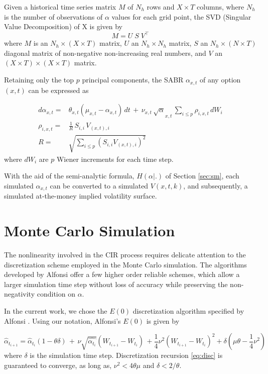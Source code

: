 \documentclass[12pt,oneside]{article}
\newcommand{\beqn}{\begin{equation}}
\newcommand{\eeqn}{\end{equation}}
\numberwithin{equation}{section}
\begin{document}
Given a historical time series matrix $M$ of $N_h$ rows and
$X\times T$ columns, where $N_h$ is the number of observations of $\alpha$ values for each grid point,
the SVD (Singular Value Decomposition) of X is given by
\beqn
M = U\;S\;V^\top
\eeqn
where $M$ is an $N_h\times(X\times T)$ matrix, $U$ an $N_h\times N_h$ matrix,
$S$ an $N_h\times(N\times T)$ diagonal matrix of non-negative non-increasing real numbers,
and $V$ an $(X\times T)\times(X\times T)$ matrix.

Retaining only the top $p$ principal components, the SABR $\alpha_{x,t}$ of any option $(x,t)$ can be expressed
as

\beqn
\begin{aligned}
d\alpha_{x,t}=&\theta_{x,t}(\mu_{x,t} - \alpha_{x,t})\,dt\,+\, \nu_{x,t}\,\sqrt\alpha_{x,t}\,
\sum_{i\le p}\rho_{i,x,t}\, dW_i\\
\rho_{i,x,t}=&\frac{1}{R}\,S_{i,i}\,V_{(x,t),i}\\[10pt]
R=&\sqrt{\sum_{i\le p}(S_{i,i}V_{(x,t),i})^2}
\end{aligned}
\eeqn
where $dW_i$ are $p$ Wiener increments for each time step.

With the aid of the semi-analytic formula, $H(\alpha|.)$ of Section \ref{sec:sm},
each simulated $\alpha_{x,t}$ can be converted to a simulated $V(x,t,k)$,
and subsequently, a simulated at-the-money implied volatility surface.

\section{Monte Carlo Simulation}
The nonlinearity involved in the CIR process requires delicate attention to the discretization
scheme employed in the Monte Carlo simulation.
The algorithms developed by Alfonsi \cite{A} offer a few higher order reliable schemes,
which allow a larger simulation time step without loss of accuracy while preserving the
non-negativity condition on $\alpha$.

In the current work, we chose the $E(0)$ discretization algorithm specified by Alfonsi \cite{A}.
Using our notation, Alfonsi's $E(0)$ is given by

\beqn\label{eq:disc}
\hat{\alpha}_{t_{i+1}}=\hat{\alpha}_{t_i}(1-\theta \delta)\,+\,\nu\sqrt{\hat{\alpha_{t_i}}}(W_{t_{i+1}}-W_{t_i})\,+
\frac{1}{4}\nu^2(W_{t_{i+1}}-W_{t_i})^2 + \delta(\mu\theta-\frac{1}{4}\nu^2)
\eeqn
where $\delta$ is the simulation time step.
Discretization recursion \eqref{eq:disc} is guaranteed to converge, as long as,
$\nu^2<4\theta\mu$ and $\delta<2/\theta$.
\end{document}
